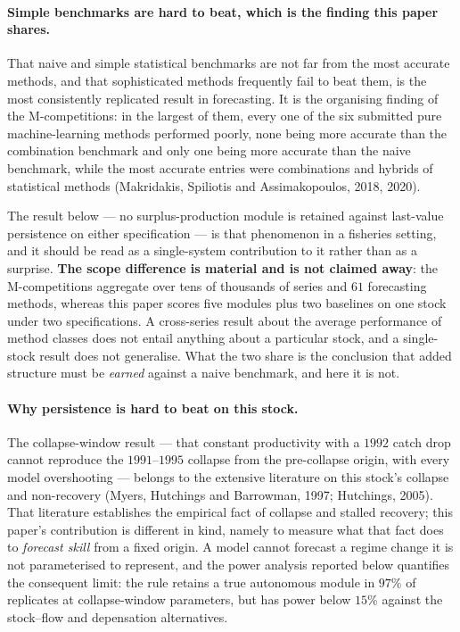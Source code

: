 \documentclass[11pt]{article}
\begin{document}
\paragraph{Simple benchmarks are hard to beat, which is the finding this paper shares.} That
naive and simple statistical benchmarks are not far from the most accurate methods, and that
sophisticated methods frequently fail to beat them, is the most consistently replicated result
in forecasting. It is the organising finding of the M-competitions: in the largest of them,
every one of the six submitted pure machine-learning methods performed poorly, none being more
accurate than the combination benchmark and only one being more accurate than the naive
benchmark, while the most accurate entries were combinations and hybrids of statistical
methods (Makridakis, Spiliotis and Assimakopoulos, 2018, 2020).

The result below --- no surplus-production module is retained against last-value persistence on
either specification --- is that phenomenon in a fisheries setting, and it should be read as a
single-system contribution to it rather than as a surprise. \textbf{The scope difference is
material and is not claimed away}: the M-competitions aggregate over tens of thousands of
series and $61$ forecasting methods, whereas this paper scores five modules plus two baselines
on one stock under two specifications. A cross-series result about the average performance of
method classes does not entail anything about a particular stock, and a single-stock result
does not generalise. What the two share is the conclusion that added structure must be
\emph{earned} against a naive benchmark, and here it is not.

\paragraph{Why persistence is hard to beat on this stock.} The collapse-window result --- that
constant productivity with a $1992$ catch drop cannot reproduce the $1991$--$1995$ collapse from
the pre-collapse origin, with every model overshooting --- belongs to the extensive literature
on this stock's collapse and non-recovery (Myers, Hutchings and Barrowman, 1997; Hutchings,
2005). That literature establishes the empirical fact of collapse and stalled recovery; this
paper's contribution is different in kind, namely to measure what that fact does to
\emph{forecast skill} from a fixed origin. A model cannot forecast a regime change it is not
parameterised to represent, and the power analysis reported below quantifies the
consequent limit: the rule retains a true autonomous module in $97\%$ of replicates at
collapse-window parameters, but has power below $15\%$ against the stock--flow and depensation
alternatives.
\end{document}
